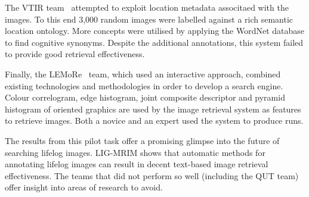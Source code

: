 The VTIR team~\cite{xia2016vtir} attempted to exploit location metadata associtaed with the images. To this end 3,000 random images were labelled against a rich semantic location ontology. More concepts were utilised by applying the WordNet database to find cognitive synonyms. Despite the additional annotations, this system failed to provide good retrieval effectiveness.

Finally, the LEMoRe~\cite{de40lemore} team, which used an interactive approach, combined existing technologies and methodologies in order to develop a search engine. Colour correlogram, edge histogram, joint composite descriptor and pyramid histogram of oriented graphics are used by the image retrieval system as features to retrieve images. Both a novice and an expert used the system to produce runs.

The results from this pilot task offer a promising glimpse into the future of searching lifelog images. LIG-MRIM shows that automatic methods for annotating lifelog images can result in decent text-based image retrieval effectiveness. The teams that did not perform so well (including the QUT team) offer insight into areas of research to avoid.